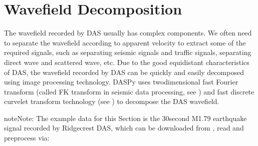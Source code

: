 \documentclass[letterpaper,10pt,english]{sphinxmanual}
\let\sphinxpxdimen\pdfpxdimen\else\newdimen\sphinxpxdimen
\begin{document}
\noindent\sphinxincludegraphics[width=700\sphinxpxdimen]{{curvelet_denoising}.png}

\sphinxstepscope


\section{Wavefield Decomposition}
\label{\detokenize{Wavefield Decomposition:wavefield-decomposition}}\label{\detokenize{Wavefield Decomposition::doc}}
\sphinxAtStartPar
The wavefield recorded by DAS usually has complex components. We often need to separate the wavefield according to apparent velocity to extract some of the required signals, such as separating seismic signals and traffic signals, separating direct wave and scattered wave, etc. Due to the good equidistant characteristics of DAS, the wavefield recorded by DAS can be quickly and easily decomposed using image processing technology. DASPy uses two\sphinxhyphen{}dimensional fast Fourier transform (called FK transform in seismic data processing, see {\hyperref[\detokenize{Wavefield Decomposition:fk-filtering}]{}} ) and fast discrete curvelet transform technology (see {\hyperref[\detokenize{Wavefield Decomposition:curvelet-windowing-technology}]{}} ) to decompose the DAS wavefield.

\begin{sphinxadmonition}{note}{Note:}
\sphinxAtStartPar
The example data for this Section is the 30\sphinxhyphen{}second M1.79 earthquake signal recorded by Ridgecrest DAS, which can be downloaded from , read and preprocess via:

\begin{sphinxVerbatim}[commandchars=\\\{\}]
   
   
  \PYG{p}{[}\PYG{p}{]} 
     
 
 
\end{sphinxVerbatim}
\end{sphinxadmonition}
\end{document}
